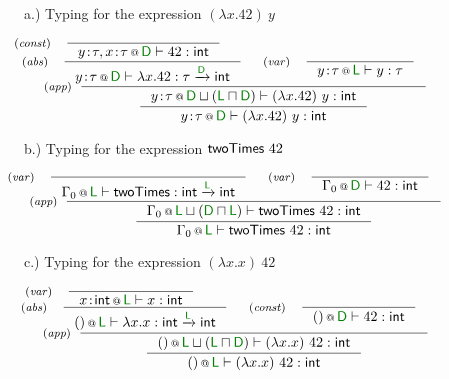 \begin{figure}[t]
{\small a.) Typing for the expression $(\lambda x . 42)~y$}

\begin{equation*}
\tyrule{app}
  { \hspace{-5em}
    \tyrule{abs}
      { \hspace{-5em}
        \tyrule{const}{}{ \coctx{y\!:\!\tau, x\!:\!\tau}{\vrd} \vdash 42 : \ident{int} } }
      { \coctx{y\!:\!\tau}{\vrd} \vdash \lambda x . 42 : \tau \xrightarrow{\vrd} \ident{int} }  &
    \tyrule{var}{}{\coctx{y\!:\!\tau}{\vrl} \vdash y : \tau } }
  { \inference 
    { \coctx{y\!:\!\tau}{\vrd \sqcup (\vrl \sqcap \vrd)} \vdash (\lambda x . 42)~y : \ident{int} }
    { \coctx{y\!:\!\tau}{\vrd} \vdash (\lambda x . 42)~y : \ident{int} } }
\end{equation*}

\vspace{1em}
{\small b.) Typing for the expression $\textnormal{\sffamily twoTimes}~42$}

\begin{equation*}
\tyrule{app}
  { \hspace{-5em}
    \tyrule{var}{}{ \coctx{\Gamma_0}{\vrl} \vdash \ident{twoTimes} : \ident{int} \xrightarrow{\vrl} \ident{int}  }&
    \tyrule{var}{}{ \coctx{\Gamma_0}{\vrd} \vdash 42 : \ident{int} } }
  { \inference 
      { \coctx{\Gamma_0}{\vrl \sqcup (\vrd \sqcap \vrl)} \vdash \ident{twoTimes}~42 : \ident{int}}
      { \coctx{\Gamma_0}{\vrl} \vdash \ident{twoTimes}~42 : \ident{int}} }
\end{equation*}

\vspace{1em}
{\small c.) Typing for the expression $(\lambda x . x)~42$}

\begin{equation*}
\tyrule{app}
  { \hspace{-5em}
    \tyrule{abs}
      { \hspace{-5em}
        \tyrule{var}{}{ \coctx{x\!:\!\ident{int}}{\vrl} \vdash x : \ident{int} } }
      { \coctx{()}{\vrl} \vdash \lambda x . x : \ident{int} \xrightarrow{\vrl} \ident{int} }  &
    \tyrule{const}{}{\coctx{()}{\vrd} \vdash 42 : \ident{int} } }
  { \inference 
    { \coctx{()}{\vrl \sqcup (\vrl \sqcap \vrd)} \vdash (\lambda x . x)~42 : \ident{int} }
    { \coctx{()}{\vrl} \vdash (\lambda x . x)~42 : \ident{int} } }
\end{equation*}


\label{fig:appendixa-liv}
\end{figure}

